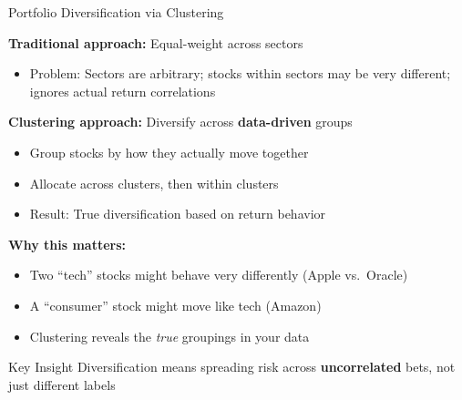 \documentclass[10pt]{beamer}
\newcommand{\highlight}[1]{\textcolor{AccentOrange}{\textbf{#1}}}
\begin{document}
\begin{frame}{Portfolio Diversification via Clustering}

  \textbf{Traditional approach:} Equal-weight across sectors
  \begin{itemize}
    \item Problem: Sectors are arbitrary; stocks within sectors may be very different; ignores actual return correlations
  \end{itemize}

  \vspace{0.5em}
  \textbf{Clustering approach:} Diversify across \highlight{data-driven} groups
  \begin{itemize}
    \item Group stocks by how they actually move together
    \item Allocate across clusters, then within clusters
    \item Result: True diversification based on return behavior
  \end{itemize}

  \vspace{1em}
  \textbf{Why this matters:}
  \begin{itemize}
    \item Two ``tech'' stocks might behave very differently (Apple vs.\ Oracle)
    \item A ``consumer'' stock might move like tech (Amazon)
    \item Clustering reveals the \emph{true} groupings in your data
  \end{itemize}

  \vspace{0.5em}
  \begin{block}{Key Insight}
    Diversification means spreading risk across \highlight{uncorrelated} bets, not just different labels
  \end{block}
\end{frame}

\end{document}

